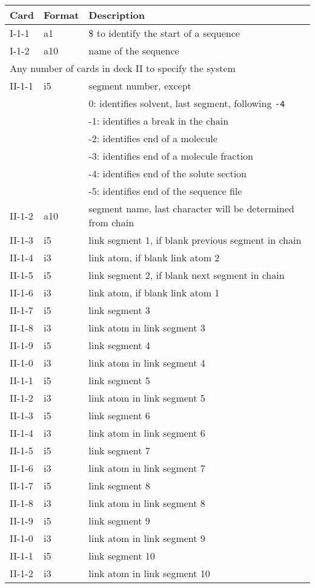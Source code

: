 \begin{table}[htbp]
\center

\label{tbl:nwaseq}

\begin{tabular*}{150mm}{p{12mm}p{12mm}l}
\hline\hline
Card & Format & Description \\ \hline
I-1-1  & a1     & \$ to identify the start of a sequence \\ %
I-1-2  & a10    & name of the sequence\\
\multicolumn{3}{l}{Any number of cards in deck II to specify the system} \\
II-1-1 & i5     & segment number, except\\
       &        &  0: identifies solvent, last segment, following \verb+-4+\\
       &        & -1: identifies a break in the chain\\
       &        & -2: identifies end of a molecule\\
       &        & -3: identifies end of a molecule fraction\\
       &        & -4: identifies end of the solute section\\
       &        & -5: identifies end of the sequence file\\
II-1-2 & a10    & segment name, last character will be determined from chain\\
II-1-3 & i5     & link segment 1, if blank previous segment in chain\\
II-1-4 & i3     & link atom, if blank link atom 2\\
II-1-5 & i5     & link segment 2, if blank next segment in chain\\
II-1-6 & i3     & link atom, if blank link atom 1\\
II-1-7 & i5     & link segment 3\\
II-1-8 & i3     & link atom in link segment 3\\
II-1-9 & i5     & link segment 4\\
II-1-0 & i3     & link atom in link segment 4\\
II-1-1 & i5     & link segment 5\\
II-1-2 & i3     & link atom in link segment 5\\
II-1-3 & i5     & link segment 6\\
II-1-4 & i3     & link atom in link segment 6\\
II-1-5 & i5     & link segment 7\\
II-1-6 & i3     & link atom in link segment 7\\
II-1-7 & i5     & link segment 8\\
II-1-8 & i3     & link atom in link segment 8\\
II-1-9 & i5     & link segment 9\\
II-1-0 & i3     & link atom in link segment 9\\
II-1-1 & i5     & link segment 10\\
II-1-2 & i3     & link atom in link segment 10\\
\hline\hline
\end{tabular*}


\end{table}
